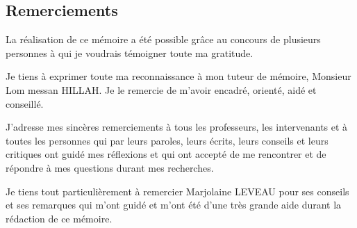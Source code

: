 \begin{center}
\subsection*{Remerciements}
\end{center}

\hskip7mm

\begin{spacing}{1.3}
La réalisation de ce mémoire a été possible grâce au concours de plusieurs personnes à qui je voudrais témoigner toute ma gratitude.

\vspace{5mm}

Je tiens à exprimer toute ma reconnaissance à mon tuteur de mémoire, Monsieur Lom messan {HILLAH}. Je le remercie de m’avoir encadré, orienté, aidé et conseillé.

\vspace{5mm}

J’adresse mes sincères remerciements à tous les professeurs, les intervenants et à toutes les personnes qui par leurs paroles, leurs écrits, leurs conseils et leurs critiques ont guidé mes réflexions et qui ont accepté de me rencontrer et de répondre à mes questions durant mes recherches.

\vspace{5mm}

Je tiens tout particulièrement à remercier Marjolaine {LEVEAU} pour ses conseils et ses remarques qui m'ont guidé et m'ont été d'une très grande aide durant la rédaction de ce mémoire.

\end{spacing}
